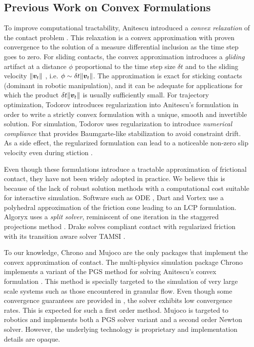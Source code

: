 \subsection{Previous Work on Convex Formulations}
To improve computational tractability, Anitescu introduced a \textit{convex
relaxation} of the contact problem \cite{bib:anitescu2006}. This relaxation is a
convex approximation with proven convergence to the solution of a measure
differential inclusion as the time step goes to zero. For sliding contacts, the
convex approximation introduces a \emph{gliding} artifact at a distance $\phi$
proportional to the time step size $\delta t$ and to the sliding velocity
$\Vert{\bm{v}}_t\Vert$ \cite{bib:mazhar2014}, i.e. $\phi\sim \delta
t\Vert{\bm{v}}_t\Vert$. The approximation is exact for sticking contacts (dominant
in robotic manipulation), and it can be adequate for applications for which the
product $\delta t\Vert{\bm{v}}_t\Vert$ is usually sufficiently small. For
trajectory optimization, Todorov \cite{bib:todorov2011} introduces
regularization into Anitescu's formulation in order to write a strictly convex
formulation with a unique, smooth and invertible solution. For simulation,
Todorov \cite{bib:todorov2014} uses regularization to introduce \emph{numerical
compliance} that provides Baumgarte-like stabilization to avoid constraint
drift. As a side effect, the regularized formulation can lead to a noticeable
non-zero slip velocity even during stiction \cite{bib:simbenchmark}.

Even though these formulations introduce a tractable approximation of frictional
contact, they have not been widely adopted in practice. We believe this is
because of the lack of robust solution methods with a computational cost
suitable for interactive simulation. Software such as ODE \cite{bib:ode}, Dart
\cite{bib:dart} and Vortex \cite{bib:vortex} use a polyhedral approximation of
the friction cone leading to an LCP formulation. Algoryx \cite{bib:algoryx} uses
a \emph{split solver}, reminiscent of one iteration in the staggered projections
method \cite{bib:Kaufman2008}. Drake \cite{bib:drake} solves compliant contact
with regularized friction with its transition aware solver TAMSI
\cite{bib:castro2020}. 

To our knowledge, Chrono \cite{bib:hrono2016} and Mujoco \cite{bib:mujoco} are
the only packages that implement the convex approximation of contact. The
multi-physics simulation package Chrono implements a variant of the PGS method
for solving Anitescu's convex formulation \cite{bib:tasora2011}. This method is
specially targeted to the simulation of very large scale systems such as those
encountered in granular flow. Even though some convergence guarantees are
provided in \cite{bib:anitescu2010}, the solver exhibits low convergence rates.
This is expected for such a first order method. Mujoco is targeted to robotics
and implements both a PGS solver variant \cite{bib:todorov2014} and a second
order Newton solver. However, the underlying technology is proprietary and
implementation details are opaque.

